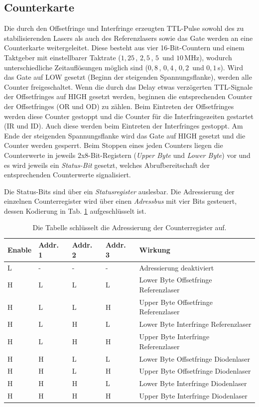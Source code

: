 \subsection{Counterkarte}\label{subsec:counterkarte}
Die durch den Offsetfringe und Interfringe erzeugten
TTL-Pulse sowohl des zu stabilisierenden Lasers als auch des Referenzlasers
sowie das Gate werden an eine Counterkarte weitergeleitet. Diese besteht aus
vier 16-Bit-Countern und einem Taktgeber mit einstellbarer Taktrate ($1,25\,$,
$2,5\,$, $5\,$ und $10\,$MHz), wodurch unterschiedliche Zeitauflösungen möglich
sind ($0,8\,$, $0,4\,$, $0,2\,$ und $0,1\,$\textmu s).
Wird das Gate auf LOW gesetzt (Beginn der steigenden Spannungsflanke), werden
alle Counter freigeschaltet. Wenn die durch
das Delay etwas verzögerten TTL-Signale der Offsetfringes auf HIGH gesetzt werden, beginnen die
entsprechenden Counter der Offsetfringes (OR und OD) zu zählen. Beim Eintreten
der Offsetfringes werden diese Counter gestoppt und die Counter für die
Interfringezeiten gestartet (IR und ID). Auch diese werden beim Eintreten der
Interfringes gestoppt. Am Ende der steigenden Spannungsflanke wird das Gate auf
HIGH gesetzt und die Counter werden gesperrt. Beim Stoppen eines jeden Counters
liegen die Counterwerte in jeweils 2x8-Bit-Registern (\textit{Upper Byte} und \textit{Lower Byte}) vor und es wird jeweils ein
\textit{Status-Bit} gesetzt, welches Abrufbereitschaft der entsprechenden
Counterwerte signalisiert.\par
Die Status-Bits sind über ein \textit{Statusregister} auslesbar. Die
Adressierung der einzelnen Counterregister wird über einen \textit{Adressbus} mit vier Bits
gesteuert, dessen Kodierung in Tab. \ref{tab:adressbus_kodierung} aufgeschlüsselt ist.
\begin{table}
	\begin{tabular}{p{}p{}p{}p{}|p{}}
		\toprule
		Enable & Addr. 1 & Addr. 2 & Addr. 3 & Wirkung\\
		\midrule[1px]
		\hline
		L & - & - & - & Adressierung deaktiviert\\
		H & L & L & L & Lower Byte Offsetfringe Referenzlaser\\
		H & L & L & H & Upper Byte Offsetfringe Referenzlaser\\
		H & L & H & L & Lower Byte Interfringe Referenzlaser\\
		H & L & H & H & Upper Byte Interfringe Referenzlaser\\
		H & H & L & L & Lower Byte Offsetfringe Diodenlaser\\
		H & H & L & H & Upper Byte Offsetfringe Diodenlaser\\
		H & H & H & L & Lower Byte Interfringe Diodenlaser\\
		H & H & H & H & Upper Byte Interfringe Diodenlaser\\
		\bottomrule[1px]
	\end{tabular}
	\caption[Adressierung Counterregister]{Die Tabelle schlüsselt die Adressierung
	der Counterregister auf.}
	\label{tab:adressbus_kodierung}
\end{table}
